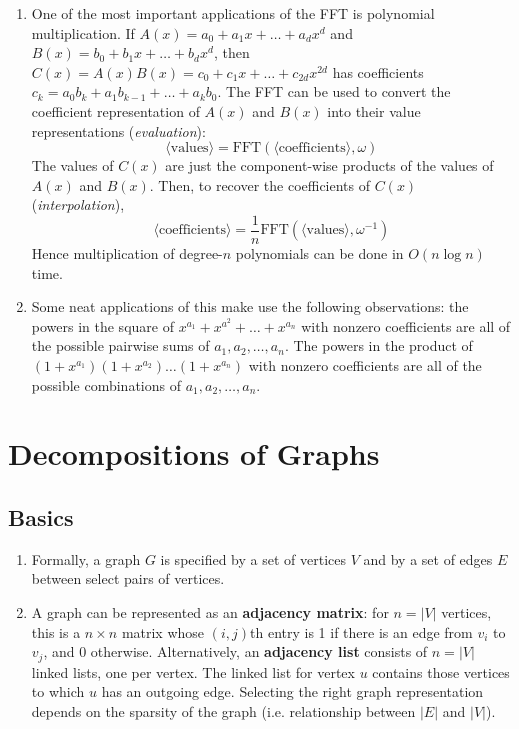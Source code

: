 \documentclass[10pt]{article}
\begin{document}
\begin{multicols}{2}
\begin{addmargin}[0.8em]{0.5em}
\begin{enumerate}[label=(\alph*)]
        \item One of the most important applications of the FFT is polynomial multiplication. If $A(x) = a_0 + a_1x + \hdots + a_{d}x^{d}$ and $B(x) = b_0 + b_1x + \hdots + b_{d}x^{d}$, then $C(x)=A(x)B(x)=c_0 + c_1 x + \hdots + c_{2d}x^{2d}$ has coefficients $c_k = a_0b_k+a_1b_{k-1}+\hdots+a_kb_0$. The FFT can be used to convert the coefficient representation of $A(x)$ and $B(x)$ into their value representations (\textit{evaluation}):
        $$\langle \text{values} \rangle = \text{FFT}(\langle\text{coefficients}\rangle, \omega)$$
        The values of $C(x)$ are just the component-wise products of the values of $A(x)$ and $B(x)$. Then, to recover the coefficients of $C(x)$ (\textit{interpolation}),
        $$\langle \text{coefficients} \rangle = \frac{1}{n}\text{FFT}(\langle\text{values}\rangle, \omega^{-1})$$
        Hence multiplication of degree-$n$ polynomials can be done in $O(n\log{n})$ time.
        \item Some neat applications of this make use the following observations: the powers in the square of $x^{a_1}+x^{a^2}+\hdots+x^{a_n}$ with nonzero coefficients are all of the possible pairwise sums of $a_1, a_2, \hdots, a_n$. The powers in the product of $(1+x^{a_1})(1+x^{a_2})\hdots(1+x^{a_n})$ with nonzero coefficients are all of the possible combinations of $a_1, a_2, \hdots, a_n$.
    \end{enumerate}        
    
\end{addmargin}

\section{Decompositions of Graphs}
\begin{addmargin}[0.8em]{0.5em}
    \subsection{Basics}
    \begin{enumerate}[label=(\alph*)]
        \item Formally, a graph $G$ is specified by a set of vertices $V$ and by a set of edges $E$ between select pairs of vertices. 
        \item A graph can be represented as an \textbf{adjacency matrix}: for $n=|V|$ vertices, this is a $n\times n$ matrix whose $(i,j)$th entry is 1 if there is an edge from $v_i$ to $v_j$, and 0 otherwise. Alternatively, an \textbf{adjacency list} consists of $n=|V|$ linked lists, one per vertex. The linked list for vertex $u$ contains those vertices to which $u$ has an outgoing edge. Selecting the right graph representation depends on the sparsity of the graph (i.e. relationship between $|E|$ and $|V|$).
    \end{enumerate}
    

\end{addmargin}
\end{multicols}
\end{document}
